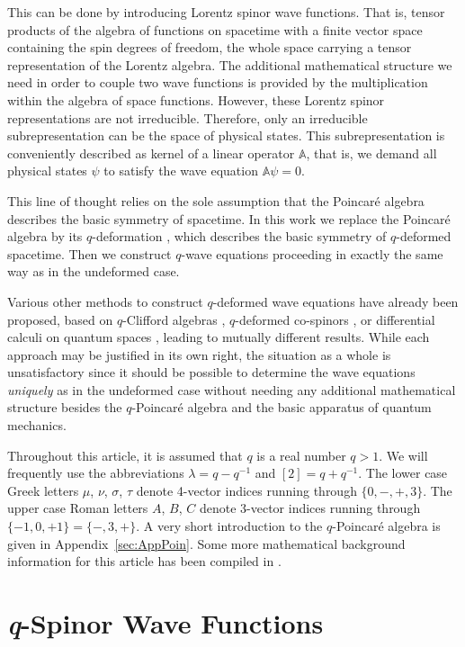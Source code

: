 \documentclass[12pt,a4paper]{article}
\begin{document}
This can be done by introducing Lorentz spinor wave functions. That
is, tensor products of the algebra of functions on spacetime with a
finite vector space containing the spin degrees of freedom, the whole
space carrying a tensor representation of the Lorentz algebra. The
additional mathematical structure we need in order to couple two wave
functions is provided by the multiplication within the algebra of
space functions. However, these Lorentz spinor representations are not
irreducible. Therefore, only an irreducible subrepresentation can be
the space of physical states. This subrepresentation is conveniently
described as kernel of a linear operator $\mathbb{A}$, that is, we
demand all physical states $\psi$ to satisfy the wave equation
$\mathbb{A}\psi = 0$.

This line of thought relies on the sole assumption that the
Poincar{\'e} algebra describes the basic symmetry of spacetime. In
this work we replace the Poincar\'e algebra by its $q$-deformation
\cite{Ogievetskii:1992a}, which describes the basic symmetry of
$q$-deformed spacetime. Then we construct $q$-wave equations
proceeding in exactly the same way as in the undeformed case.

Various other methods to construct $q$-deformed wave equations have
already been proposed, based on $q$-Clifford algebras
\cite{Schirrmacher:1992}, $q$-deformed co-spinors \cite{Pillin:1994b},
or differential calculi on quantum spaces
\cite{Song:1992,Meyer:1995,Podles:1996}, leading to mutually different
results. While each approach may be justified in its own right, the
situation as a whole is unsatisfactory since it should be possible to
determine the wave equations \emph{uniquely} as in the undeformed case
\cite{BarutRaczka} without needing any additional mathematical
structure besides the $q$-Poincar\'e algebra and the basic apparatus
of quantum mechanics.

Throughout this article, it is assumed that $q$ is a real number
$q>1$. We will frequently use the abbreviations $\lambda = q - q^{-1}$
and $[2] = q+q^{-1}$. The lower case Greek letters $\mu$, $\nu$,
$\sigma$, $\tau$ denote 4-vector indices running through $\{0,-,+,3\}$.
The upper case Roman letters $A$, $B$, $C$ denote 3-vector indices
running through $\{-1,0,+1\} = \{-,3,+\}$. A very short introduction
to the $q$-Poincar{\'e} algebra is given in
Appendix~\ref{sec:AppPoin}. Some more mathematical background
information for this article has been compiled in \cite{Blohmann}.


\section{\textit{q}-Spinor Wave Functions}
\end{document}
